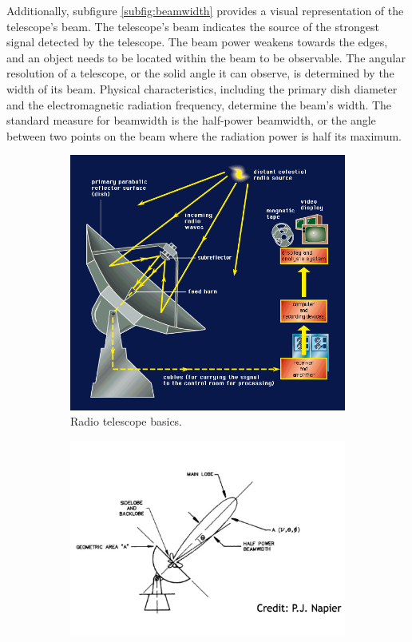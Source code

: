 Additionally, subfigure \ref{subfig:beamwidth} provides a visual representation of the telescope's beam.
The telescope's beam indicates the source of the strongest signal detected by the telescope.
The beam power weakens towards the edges, and an object needs to be located within the beam to be observable.
The angular resolution of a telescope, or the solid angle it can observe, is determined by the width of its beam.
Physical characteristics, including the primary dish diameter and the electromagnetic radiation frequency, determine the beam's width.
The standard measure for beamwidth is the half-power beamwidth, or the angle between two points on the beam where the radiation power is half its maximum.

\begin{figure}[H]
    \centering
    \begin{subfigure}[t]{0.49\textwidth}
        \centering
        \includegraphics[width=\textwidth]{Astronomy/radio_telescope.png}
        \caption{Radio telescope basics.}
        \label{subfig:radio_telescope}
    \end{subfigure}
    \hfill
    \begin{subfigure}[t]{0.49\textwidth}
       \centering
       \includegraphics[width=\textwidth]{Astronomy/beamwidth_sketch_cropped.png}

\end{subfigure}
\end{figure}
